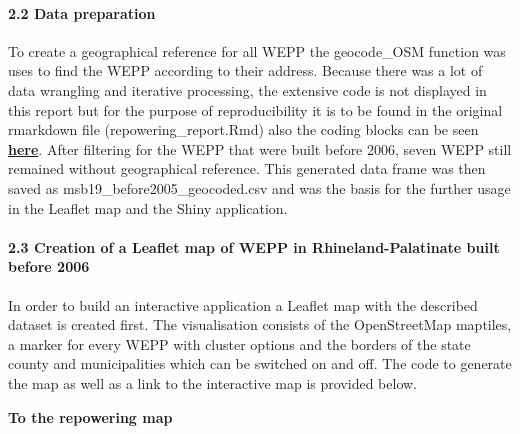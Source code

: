\documentclass[
]{article}
\begin{document}
\hypertarget{data-preparation}{%
\paragraph{2.2 Data preparation}\label{data-preparation}}

To create a geographical reference for all WEPP the geocode\_OSM
function was uses to find the WEPP according to their address. Because
there was a lot of data wrangling and iterative processing, the
extensive code is not displayed in this report but for the purpose of
reproducibility it is to be found in the original rmarkdown file
(repowering\_report.Rmd) also the coding blocks can be seen
\href{rscripts//repowering_data_preparation.R}{\textbf{here}}. After
filtering for the WEPP that were built before 2006, seven WEPP still
remained without geographical reference. This generated data frame was
then saved as msb19\_before2005\_geocoded.csv and was the basis for the
further usage in the Leaflet map and the Shiny application.

\hypertarget{creation-of-a-leaflet-map-of-wepp-in-rhineland-palatinate-built-before-2006}{%
\paragraph{2.3 Creation of a Leaflet map of WEPP in Rhineland-Palatinate
built before
2006}\label{creation-of-a-leaflet-map-of-wepp-in-rhineland-palatinate-built-before-2006}}

In order to build an interactive application a Leaflet map with the
described dataset is created first. The visualisation consists of the
OpenStreetMap maptiles, a marker for every WEPP with cluster options and
the borders of the state county and municipalities which can be switched
on and off. The code to generate the map as well as a link to the
interactive map is provided below.

\textbf{To the repowering map}
\end{document}
